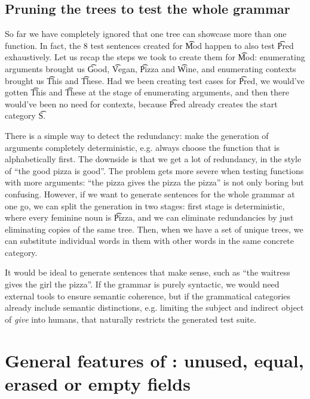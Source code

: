 \subsection{Pruning the trees to test the whole grammar}
\label{sec:pruning_all}
So far we have completely ignored that one tree can showcase more
than one function. In fact, the 8 test sentences created for \t{Mod}
happen to also test \t{Pred} exhaustively.
Let us recap the steps we took to create them for \t{Mod}:
enumerating arguments brought us \t{Good}, \t{Vegan}, \t{Pizza} and
\t{Wine}, and enumerating contexts brought us \t{This} and
\t{These}. Had we been creating test cases for \t{Pred}, we would've
gotten \t{This} and \t{These} at the stage of enumerating arguments,
and then there would've been no need for contexts, because \t{Pred}
already creates the start category \t{S}.

There is a simple way to detect the redundancy: make the generation of
arguments completely deterministic, e.g. always choose the function
that is alphabetically first. The downside is that we get a lot of
redundancy, in the style of ``the good pizza is good''. The problem
gets more severe when testing functions with more arguments: ``the
pizza gives the pizza the pizza'' is not only boring but confusing.
However, if we want to generate sentences for the whole grammar at one 
go, we can split the generation in two stages: first stage is
deterministic, where every feminine noun is \t{Pizza}, and we can 
eliminate redundancies by just eliminating copies of the same
tree. Then, when we have a set of unique trees, we can substitute
individual words in them with other words in the same concrete
category.

It would be ideal to generate sentences that make sense,
such as ``the waitress gives the girl the pizza''. If the grammar is
purely syntactic, we would need external tools to ensure semantic
coherence, but if the grammatical categories already include semantic
distinctions, e.g. limiting the subject and indirect object of
\emph{give} into humans, that naturally restricts the generated test
suite.

\section{General features of \pmcfg: unused, equal,
  erased or empty fields}

